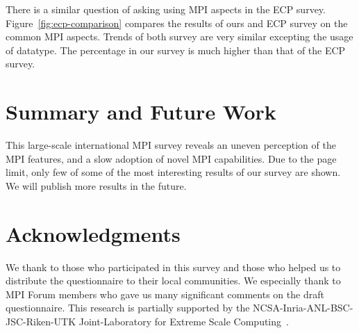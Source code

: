 \documentclass[sigconf,nonacm]{acmart}
\begin{document}
There is a similar question of asking using MPI aspects in the ECP
survey. Figure~\ref{fig:ecp-comparison} compares the results of ours
and ECP survey on the common MPI aspects. Trends of both survey are
very similar excepting the usage of datatype. The percentage in our
survey is much higher than that of the ECP survey. 

\section{Summary and Future Work}

This large-scale international MPI survey reveals an uneven perception
of the MPI features, and a slow adoption of novel MPI
capabilities. Due to the page limit, only few of some of the most
interesting results of our survey are shown. We will publish more
results in the future.

%

\section*{Acknowledgments}
We thank to those who participated in this survey and those who
helped us to distribute the questionnaire to their local
communities. We especially thank to MPI Forum members who gave us many
significant comments on the draft questionnaire.
This research is partially supported by the
NCSA-Inria-ANL-BSC-JSC-Riken-UTK Joint-Laboratory for Extreme Scale
Computing~\cite{JLESC}.



\end{document}
